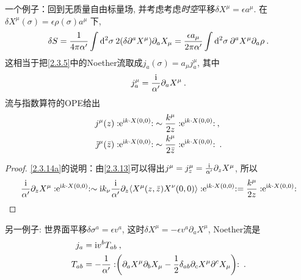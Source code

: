 一个例子：回到无质量自由标量场, 并考虑考虑\emph{时空}平移$\delta X^{\mu}=\epsilon a^{\mu}$. 在$\delta X^{\mu}(\sigma)=\epsilon \rho(\sigma) a^{\mu}$ 下,
\begin{align}
\delta S=\frac{1}{4 \pi \alpha^{\prime}} \int \mathrm{d}^{2}\sigma\: 2(\delta \partial^{a} X^{\mu}) \partial_{a} X_{\mu} 
=\frac{\epsilon a_{\mu}}{2 \pi \alpha^{\prime}} \int \mathrm{d}^{2} \sigma \:\partial^{a} X^{\mu} \partial_{a} \rho \:.
\end{align}
这相当于把\eqref{2.3.5}中的Noether流取成$j_{a}(\sigma)=a_{\mu} j_{a}^{\mu}$, 其中
\begin{equation}
j_{a}^{\mu}=\frac{\mathrm{i}}{\alpha^{\prime}} \partial_{a} X^{\mu} \:. \label{2.3.13}
\end{equation}
流与指数算符的OPE给出
\begin{subequations} \label{2.3.14}
\begin{align}
j^{\mu}(z): \mathrel{\mathrm{e}^{\mathrm{i} k \cdot X(0,0)}}: &\sim \frac{k^{\mu}}{2 z}: \mathrel{\mathrm{e}^{\mathrm{i} k \cdot X(0,0)}}:  \:,\label{2.3.14a} \\
\tilde{\jmath}^{\mu}(\bar{z}):\mathrel{ \mathrm{e}^{\mathrm{i} k \cdot X(0,0)}}: &\sim \frac{k^{\mu}}{2 \bar{z}}: 
\mathrel{\mathrm{e}^{\mathrm{i} k \cdot X(0,0)}}:\:. \label{2.3.14b}
\end{align}
\end{subequations}
\begin{tcolorbox}
	\begin{proof}
		\eqref{2.3.14a}的说明：由\eqref{2.3.13}可以得出$j^{\mu}=j_{z}^{\mu}=\frac{\mathrm{i}}{\alpha^{\prime}} \partial_{z} X^{\mu}$, 所以
		\begin{align*}
			\frac{\mathrm{i}}{\alpha^{\prime}} \partial_{z} X^{\mu} : \mathrel{\mathrm{e}^{\mathrm{i} k \cdot X(0,0)}}: \sim 
			\mathrm{i} k_{\nu}\frac{\mathrm{i}}{\alpha^{\prime}} \partial_{z} \langle X^{\mu}(z,\bar{z})X^{\nu}(0,0)\rangle : \mathrel{\mathrm{e}^{\mathrm{i} k \cdot X(0,0)}}: 
			=\frac{k^{\mu}}{2 z}: \mathrel{\mathrm{e}^{\mathrm{i} k \cdot X(0,0)}}:
		\end{align*}
		\end{proof}
\end{tcolorbox}

另一例子: 世界面平移$\delta \sigma^{a}=\epsilon v^{a}$, 这时$\delta X^{\mu}=-\epsilon v^{a} \partial_{a} X^{\mu}$, Noether流是
\begin{subequations}
\begin{align}
j_{a}  &=\mathrm{i} v^{b} T_{a b} \:, \label{2.3.15a} \\
T_{a b}&=-\frac{1}{\alpha^{\prime}}:\mathrel{\biggl(\partial_{a} X^{\mu} \partial_{b} X_{\mu}-\frac{1}{2} \delta_{a b} \partial_{c} X^{\mu} \partial^{c} X_{\mu}\biggr)}: \:. \label{2.3.15b}
\end{align}
\end{subequations}

